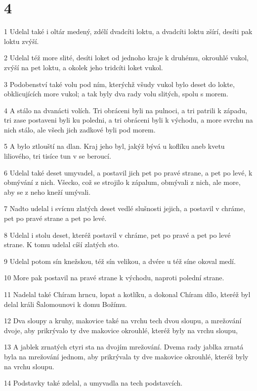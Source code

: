 \chapter{4}

\par 1 Udelal také i oltár medený, zdélí dvadcíti loktu, a dvadcíti loktu zšírí, desíti pak loktu zvýší.
\par 2 Udelal též more slité, desíti loket od jednoho kraje k druhému, okrouhlé vukol, zvýší na pet loktu, a okolek jeho tridcíti loket vukol.
\par 3 Podobenství také volu pod ním, kterýchž všudy vukol bylo deset do lokte, obklicujících more vukol; a tak byly dva rady volu slitých, spolu s morem.
\par 4 A stálo na dvanácti volích. Tri obráceni byli na pulnoci, a tri patrili k západu, tri zase postaveni byli ku poledni, a tri obráceni byli k východu, a more svrchu na nich stálo, ale všech jich zadkové byli pod morem.
\par 5 A bylo ztlouští na dlan. Kraj jeho byl, jakýž bývá u koflíku aneb kvetu liliového, tri tisíce tun v se beroucí.
\par 6 Udelal také deset umyvadel, a postavil jich pet po pravé strane, a pet po levé, k obmývání z nich. Všecko, což se strojilo k zápalum, obmývali z nich, ale more, aby se z neho kneží umývali.
\par 7 Nadto udelal i svícnu zlatých deset vedlé slušnosti jejich, a postavil v chráme, pet po pravé strane a pet po levé.
\par 8 Udelal i stolu deset, kteréž postavil v chráme, pet po pravé a pet po levé strane. K tomu udelal cíší zlatých sto.
\par 9 Udelal potom sín knežskou, též sín velikou, a dvére u též síne okoval medí.
\par 10 More pak postavil na pravé strane k východu, naproti polední strane.
\par 11 Nadelal také Chíram hrncu, lopat a kotlíku, a dokonal Chíram dílo, kteréž byl delal králi Šalomounovi k domu Božímu.
\par 12 Dva sloupy a kruhy, makovice také na vrchu tech dvou sloupu, a mrežování dvoje, aby prikrývalo ty dve makovice okrouhlé, kteréž byly na vrchu sloupu,
\par 13 A jablek zrnatých ctyri sta na dvojím mrežování. Dvema rady jablka zrnatá byla na mrežování jednom, aby prikrývala ty dve makovice okrouhlé, kteréž byly na vrchu sloupu.
\par 14 Podstavky také zdelal, a umyvadla na tech podstavcích.
